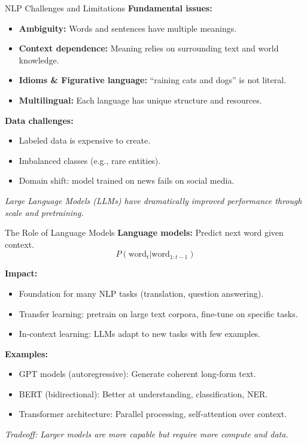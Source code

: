 \documentclass[10pt]{beamer}
\begin{document}
\begin{frame}{NLP Challenges and Limitations}
    \textbf{Fundamental issues:}
    \begin{itemize}
        \item \textbf{Ambiguity:} Words and sentences have multiple meanings.
        \item \textbf{Context dependence:} Meaning relies on surrounding text and world knowledge.
        \item \textbf{Idioms \& Figurative language:} ``raining cats and dogs'' is not literal.
        \item \textbf{Multilingual:} Each language has unique structure and resources.
    \end{itemize}

    \vspace{0.2cm}
    \textbf{Data challenges:}
    \begin{itemize}
        \item Labeled data is expensive to create.
        \item Imbalanced classes (e.g., rare entities).
        \item Domain shift: model trained on news fails on social media.
    \end{itemize}

    \vspace{0.2cm}
    \textit{Large Language Models (LLMs) have dramatically improved performance through scale and pretraining.}
\end{frame}

\begin{frame}{The Role of Language Models}
    \textbf{Language models:} Predict next word given context.
    \[
        P(\text{word}_t | \text{word}_{1:t-1})
    \]

    \vspace{0.2cm}
    \textbf{Impact:}
    \begin{itemize}
        \item Foundation for many NLP tasks (translation, question answering).
        \item Transfer learning: pretrain on large text corpora, fine-tune on specific tasks.
        \item In-context learning: LLMs adapt to new tasks with few examples.
    \end{itemize}

    \vspace{0.2cm}
    \textbf{Examples:}
    \begin{itemize}
        \item GPT models (autoregressive): Generate coherent long-form text.
        \item BERT (bidirectional): Better at understanding, classification, NER.
        \item Transformer architecture: Parallel processing, self-attention over context.
    \end{itemize}

    \vspace{0.2cm}
    \textit{Tradeoff: Larger models are more capable but require more compute and data.}
\end{frame}
\end{document}
